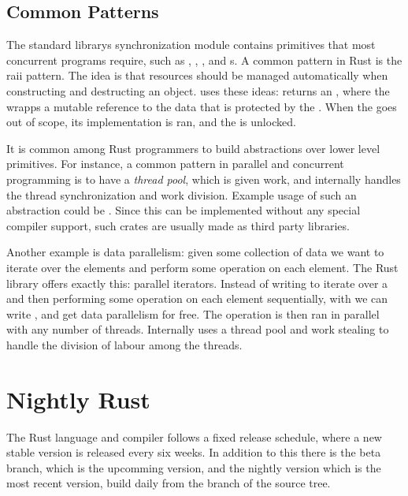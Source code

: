 \subsection{Common Patterns}

The standard librarys synchronization module  contains primitives that most
concurrent programs require, such as , , , and
s. A common pattern in Rust is the \gls{raii} pattern. The idea is that resources
should be managed automatically when constructing and destructing an object.  uses
these ideas:  returns an , where the 
wrapps a mutable reference to the data that is protected by the . When the
 goes out of scope, its  implementation is ran, and the  is
unlocked.

It is common among Rust programmers to build abstractions over lower level primitives. For
instance, a common pattern in parallel and concurrent programming is to have a \emph{thread pool},
which is given work, and internally handles the thread synchronization and work division. Example
usage of such an abstraction could be .
Since this can be implemented without any special compiler support, such crates are usually made as
third party libraries.

Another example is data parallelism: given some collection of data we want to iterate over the
elements and perform some operation on each element. The Rust library  offers exactly
this: parallel iterators. Instead of writing  to iterate over a  and
then performing some operation on each element sequentially, with  we can write
, and get data parallelism for free. The operation is then ran in parallel
with any number of threads. Internally  uses a thread pool and work stealing to handle
the division of labour among the threads.


\section{Nightly Rust}

The Rust language and compiler follows a fixed release schedule, where a new stable version is
released every six weeks. In addition to this there is the beta branch, which is the upcomming
version, and the nightly version which is the most recent version, build daily from the
 branch of the source tree.

